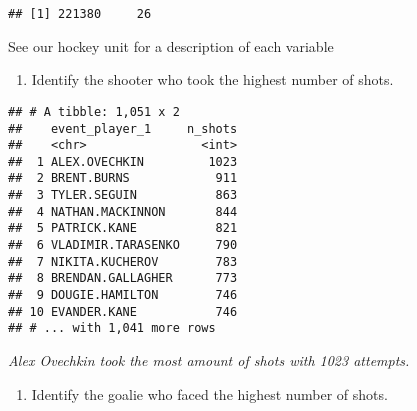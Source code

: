 \documentclass[]{article}
\newenvironment{Shaded}{\begin{snugshade}}{\end{snugshade}}
\newcommand{\DataTypeTok}[1]{\textcolor[rgb]{0.13,0.29,0.53}{#1}}
\newcommand{\DecValTok}[1]{\textcolor[rgb]{0.00,0.00,0.81}{#1}}
\newcommand{\KeywordTok}[1]{\textcolor[rgb]{0.13,0.29,0.53}{\textbf{#1}}}
\newcommand{\NormalTok}[1]{#1}
\newcommand{\OperatorTok}[1]{\textcolor[rgb]{0.81,0.36,0.00}{\textbf{#1}}}
\newcommand{\StringTok}[1]{\textcolor[rgb]{0.31,0.60,0.02}{#1}}
\providecommand{\tightlist}{%
  \setlength{\itemsep}{0pt}\setlength{\parskip}{0pt}}
\begin{document}
\begin{verbatim}
## [1] 221380     26
\end{verbatim}

See our hockey unit for a description of each variable

\begin{enumerate}
\def\labelenumi{\arabic{enumi}.}
\tightlist
\item
  Identify the shooter who took the highest number of shots.
\end{enumerate}

\begin{Shaded}
\end{Shaded}

\begin{verbatim}
## # A tibble: 1,051 x 2
##    event_player_1     n_shots
##    <chr>                <int>
##  1 ALEX.OVECHKIN         1023
##  2 BRENT.BURNS            911
##  3 TYLER.SEGUIN           863
##  4 NATHAN.MACKINNON       844
##  5 PATRICK.KANE           821
##  6 VLADIMIR.TARASENKO     790
##  7 NIKITA.KUCHEROV        783
##  8 BRENDAN.GALLAGHER      773
##  9 DOUGIE.HAMILTON        746
## 10 EVANDER.KANE           746
## # ... with 1,041 more rows
\end{verbatim}

\emph{Alex Ovechkin took the most amount of shots with 1023 attempts.}

\begin{enumerate}
\def\labelenumi{\arabic{enumi}.}
\setcounter{enumi}{1}
\tightlist
\item
  Identify the goalie who faced the highest number of shots.
\end{enumerate}

\begin{Shaded}
\end{Shaded}
\end{document}
